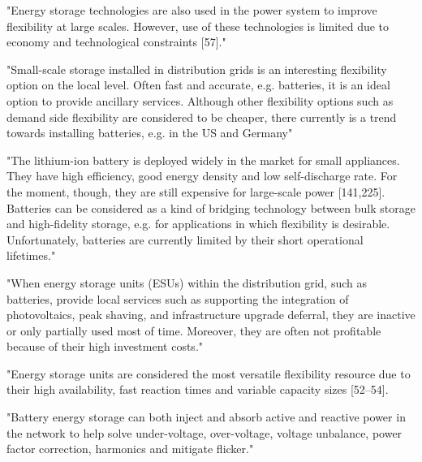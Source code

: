 "Energy storage technologies are also used in the power system to improve flexibility at large scales. However, use of these technologies is limited due to economy and technological constraints [57]." \cite{kaushik_comprehensive_2022} 

"Small-scale storage installed in distribution grids is an interesting flexibility option on the local level. Often fast and accurate, e.g. batteries, it is an ideal option to provide ancillary services. Although other flexibility options such as demand side flexibility are considered to be cheaper, there currently is a trend towards installing batteries, e.g. in the US and Germany" \cite{g_papaefthymiou_power_2018} 

"The lithium-ion battery is deployed widely in the market for small appliances. They have high efficiency, good energy density and low self-discharge rate. For the moment, though, they are still expensive for large-scale power [141,225]. Batteries can be considered as a kind of bridging technology between bulk storage and high-fidelity storage, e.g. for applications in which flexibility is desirable. Unfortunately, batteries are currently limited by their short operational lifetimes." \cite{lund_review_2015} 

"When energy storage units (ESUs) within the distribution grid, such as batteries, provide local services such as supporting the integration of photovoltaics, peak shaving, and infrastructure upgrade deferral, they are inactive or only partially used most of time. Moreover, they are often not profitable because of their high investment costs." \cite{olivier_megel_scheduling_2015}

"Energy storage units are considered the most versatile flexibility resource due to their high availability, fast reaction times and variable capacity sizes [52–54]. \cite{lechl_review_2023}

"Battery energy storage can both inject and absorb active and reactive power in the network to help solve under-voltage, over-voltage, voltage unbalance, power factor correction, harmonics and mitigate flicker." \cite{degefa_comprehensive_2021}


